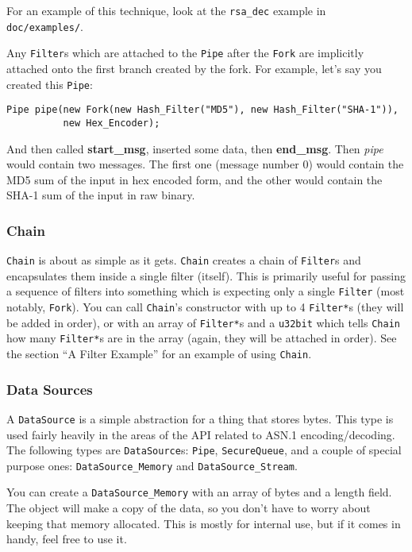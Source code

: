 \documentclass{article}
\newcommand{\filename}[1]{\texttt{#1}}
\newcommand{\function}[1]{\textbf{#1}}
\newcommand{\type}[1]{\texttt{#1}}
\renewcommand{\arg}[1]{\textsl{#1}}
\begin{document}
For an example of this technique, look at the \filename{rsa\_dec} example in
\filename{doc/examples/}.

Any \type{Filter}s which are attached to the \type{Pipe} after the \type{Fork}
are implicitly attached onto the first branch created by the fork. For example,
let's say you created this \type{Pipe}:

\begin{verbatim}
Pipe pipe(new Fork(new Hash_Filter("MD5"), new Hash_Filter("SHA-1")),
          new Hex_Encoder);
\end{verbatim}

And then called \function{start\_msg}, inserted some data, then
\function{end\_msg}. Then \arg{pipe} would contain two messages. The first one
(message number 0) would contain the MD5 sum of the input in hex encoded form,
and the other would contain the SHA-1 sum of the input in raw binary.

\subsubsection{Chain}

\type{Chain} is about as simple as it gets. \type{Chain} creates a chain of
\type{Filter}s and encapsulates them inside a single filter (itself). This is
primarily useful for passing a sequence of filters into something which is
expecting only a single \type{Filter} (most notably, \type{Fork}). You can call
\type{Chain}'s constructor with up to 4 \type{Filter*}s (they will be added in
order), or with an array of \type{Filter*}s and a \type{u32bit} which tells
\type{Chain} how many \type{Filter*}s are in the array (again, they will be
attached in order). See the section ``A Filter Example'' for an example of
using \type{Chain}.

\subsubsection{Data Sources}

A \type{DataSource} is a simple abstraction for a thing that stores bytes. This
type is used fairly heavily in the areas of the API related to ASN.1
encoding/decoding. The following types are \type{DataSource}s: \type{Pipe},
\type{SecureQueue}, and a couple of special purpose ones:
\type{DataSource\_Memory} and \type{DataSource\_Stream}.

You can create a \type{DataSource\_Memory} with an array of bytes and a length
field. The object will make a copy of the data, so you don't have to worry
about keeping that memory allocated. This is mostly for internal use, but if it
comes in handy, feel free to use it.
\end{document}
